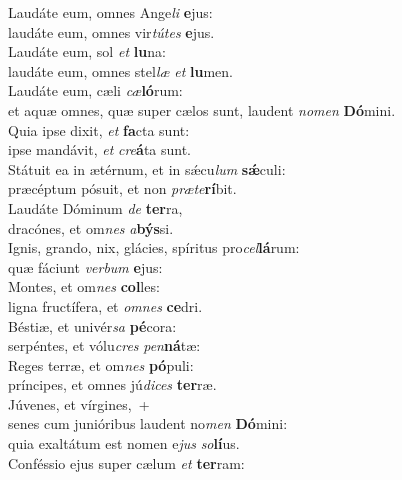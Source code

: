 \evenverse Laudáte eum, omnes Ange\textit{li} \textbf{e}jus:~\*\\
\evenverse laudáte eum, omnes vir\textit{tú}\textit{tes} \textbf{e}jus.\\
\oddverse Laudáte eum, sol \textit{et} \textbf{lu}na:~\*\\
\oddverse laudáte eum, omnes stel\textit{læ} \textit{et} \textbf{lu}men.\\
\evenverse Laudáte eum, cæli \textit{cæ}\textbf{ló}rum:~\*\\
\evenverse et aquæ omnes, quæ super cælos sunt, laudent \textit{no}\textit{men} \textbf{Dó}mini.\\
\oddverse Quia ipse dixit, \textit{et} \textbf{fa}cta sunt:~\*\\
\oddverse ipse mandávit, \textit{et} \textit{cre}\textbf{á}ta sunt.\\
\evenverse Státuit ea in ætérnum, et in sǽcu\textit{lum} \textbf{sǽ}culi:~\*\\
\evenverse præcéptum pósuit, et non \textit{præ}\textit{te}\textbf{rí}bit.\\
\oddverse Laudáte Dóminum \textit{de} \textbf{ter}ra,~\*\\
\oddverse dracónes, et om\textit{nes} \textit{a}\textbf{býs}si.\\
\evenverse Ignis, grando, nix, glácies, spíritus pro\textit{cel}\textbf{lá}rum:~\*\\
\evenverse quæ fáciunt \textit{ver}\textit{bum} \textbf{e}jus:\\
\oddverse Montes, et om\textit{nes} \textbf{col}les:~\*\\
\oddverse ligna fructífera, et \textit{om}\textit{nes} \textbf{ce}dri.\\
\evenverse Béstiæ, et univér\textit{sa} \textbf{pé}cora:~\*\\
\evenverse serpéntes, et vólu\textit{cres} \textit{pen}\textbf{ná}tæ:\\
\oddverse Reges terræ, et om\textit{nes} \textbf{pó}puli:~\*\\
\oddverse príncipes, et omnes jú\textit{di}\textit{ces} \textbf{ter}ræ.\\
\evenverse Júvenes, et vírgines,~+\\
\evenverse  senes cum junióribus laudent no\textit{men} \textbf{Dó}mini:~\*\\
\evenverse quia exaltátum est nomen e\textit{jus} \textit{so}\textbf{lí}us.\\
\oddverse Conféssio ejus super cælum \textit{et} \textbf{ter}ram:~\*\\
